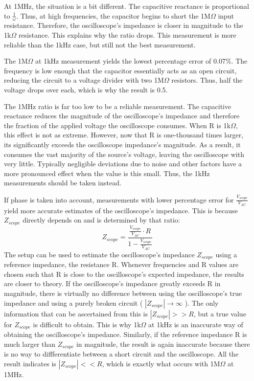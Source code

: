 At 1MHz, the situation is a bit different. The capacitive reactance is proportional to $\frac{1}{\omega}$. Thus, at high frequencies, the capacitor begins to short the 1M$\Omega$ input resistance. Therefore, the oscilloscope's impedance is closer in magnitude to the 1k$\Omega$ resistance. This explains why the ratio drops. This measurement is more reliable than the 1kHz case, but still not the best measurement.

The 1M$\Omega$ at 1kHz measurement yields the lowest percentage error of 0.07\%. The frequency is low enough that the capacitor essentially acts as an open circuit, reducing the circuit to a voltage divider with two 1M$\Omega$ resistors. Thus, half the voltage drops over each, which is why the result is 0.5.

The 1MHz ratio is far too low to be a reliable measurement. The capacitive reactance reduces the magnitude of the oscilloscope's impedance and therefore the fraction of the applied voltage the oscilloscope consumes. When R is 1k$\Omega$, this effect is not as extreme. However, now that R is one-thousand times larger, its significantly exceeds the oscilloscope impedance's magnitude. As a result, it consumes the vast majority of the source's voltage, leaving the oscilloscope with very little. Typically negligible deviations due to noise and other factors have a more pronounced effect when the value is this small. Thus, the 1kHz measurements should be taken instead.

If phase is taken into account, measurements with lower percentage error for $\frac{V_{scope}}{V_{AC}}$ yield more accurate estimates of the oscilloscope's impedance. This is because $Z_{scope}$ directly depends on and is determined by that ratio:
\begin{equation}
\label{eq:zscope}
Z_{scope} = \frac{\frac{V_{scope}}{V_{AC}} \cdot R }{1 - \frac{V_{scope}}{V_{AC}}}
\end{equation}
The setup can be used to estimate the oscilloscope's impedance $Z_{scope}$ using a reference impedance, the resistance R. Whenever frequencies and R values are chosen such that R is close to the oscilloscope's expected impedance, the results are closer to theory. If the oscilloscope's impedance greatly exceeds R in magnitude, there is virtually no difference between using the oscilloscope's true impedance and using a purely broken circuit ( $|Z_{scope}| \rightarrow \infty$ ). The only information that can be ascertained from this is $|Z_{scope}| >> R$, but a true value for $Z_{scope}$ is difficult to obtain. This is why 1k$\Omega$ at 1kHz is an inaccurate way of obtaining the oscilloscope's impedance.
Similarly, if the reference impedance R is much larger than $Z_{scope}$ in magnitude, the result is again inaccurate because there is no way to diffferentiate between a short circuit and the oscilloscope. All the result indicates is $|Z_{scope}| << R$, which is exactly what occurs with 1M$\Omega$ at 1MHz.

